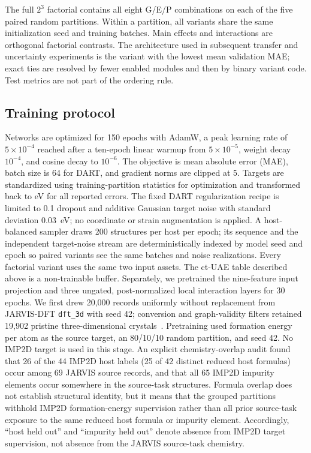 The full $2^3$ factorial contains all eight G/E/P combinations on each of the
five paired random partitions.  Within a partition, all variants share the
same initialization seed and training batches.  Main effects and interactions
are orthogonal factorial contrasts.  The architecture used in subsequent
transfer and uncertainty experiments is the variant with the lowest mean
validation MAE; exact ties are resolved by fewer enabled modules and then by
binary variant code.  Test metrics are not part of the ordering rule.

\subsection{Training protocol}
\label{sec:training}

Networks are optimized for 150 epochs with AdamW, a peak learning rate of
$5\times10^{-4}$ reached after a ten-epoch linear warmup from
$5\times10^{-5}$, weight decay $10^{-4}$, and cosine decay to $10^{-6}$.
The objective is mean absolute error (MAE), batch size is 64 for DART, and
gradient norms are clipped at 5.  Targets are
standardized using training-partition statistics for optimization and
transformed back to eV for all reported errors.  The fixed DART regularization
recipe is limited to 0.1 dropout and additive Gaussian target noise with
standard deviation 0.03~eV; no coordinate or strain augmentation is applied.
A host-balanced sampler draws 200 structures per host per epoch; its sequence
and the independent target-noise stream are deterministically indexed by model
seed and epoch so paired variants see the same batches and noise realizations.
Every factorial variant uses the same two input assets.  The ct-UAE table
described above is a non-trainable buffer.  Separately, we pretrained the
nine-feature input projection and three ungated, post-normalized local
interaction layers for 30 epochs.
We first drew 20,000 records uniformly without replacement from JARVIS-DFT
\texttt{dft\_3d} with seed 42; conversion and graph-validity filters retained
19,902 pristine three-dimensional crystals~\cite{jarvis2020}.  Pretraining
used formation energy per atom as the source target, an 80/10/10 random
partition, and seed 42.  No IMP2D target is used in this stage.
An explicit chemistry-overlap audit found that 26 of the 44 IMP2D host labels
(25 of 42 distinct reduced host formulas) occur among 69 JARVIS source
records, and that all 65 IMP2D impurity elements occur somewhere in the
source-task structures.  Formula overlap does not establish structural
identity, but it means that the grouped partitions withhold IMP2D
formation-energy supervision rather than all prior source-task exposure to the
same reduced host formula or impurity element.  Accordingly, ``host held out''
and ``impurity held out'' denote absence from IMP2D target supervision, not
absence from the JARVIS source-task chemistry.

